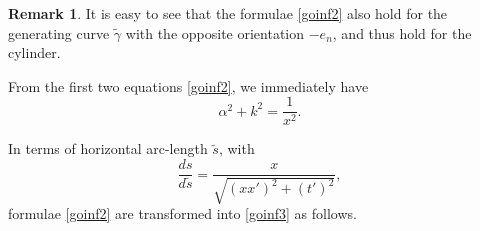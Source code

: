 \documentclass[12pt]{amsart}
\theoremstyle{definition}\newtheorem{exa}[thm]{\sc Example}
\theoremstyle{definition}\newtheorem{de}[thm]{\sc Definition}
\theoremstyle{definition}\newtheorem{rem}[thm]{\sc Remark}
\theoremstyle{definition}\newtheorem{prob}[thm]{\it Problem}
\theoremstyle{definition}\newtheorem{fact}[thm]{\sc Fact}
\theoremstyle{definition}\newtheorem{claim}[thm]{\sc Claim}
\numberwithin{equation}{section}
\begin{document}
\begin{rem}
It is easy to see that the formulae \eqref{goinf2} also hold for the generating curve $\tilde{\gamma}$ with the opposite orientation $-e_{n}$, and thus hold for the cylinder.
\end{rem}

From the first two equations \eqref{goinf2}, we immediately have
\begin{equation}\label{fogecu}
\alpha^2+k^2=\frac{1}{x^2}.
\end{equation}


In terms of horizontal arc-length $\tilde{s}$, with 
\begin{equation}\label{jacob}
\frac{ds}{d\tilde{s}}=\frac{x}{\sqrt{(xx')^2+(t')^2}},
\end{equation}
formulae \eqref{goinf2} are transformed into \eqref{goinf3} as follows.
 
\end{document}
